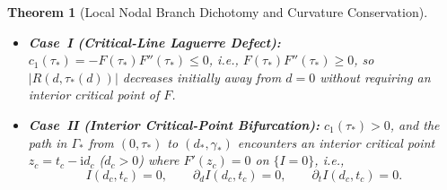 \documentclass[11pt,reqno]{amsart}
\newtheorem{theorem}{Theorem}[section]
\theoremstyle{definition}
\theoremstyle{remark}
\numberwithin{equation}{section}
\newcommand{\ii}{\mathrm{i}}
\begin{document}
\begin{theorem}[Local Nodal Branch Dichotomy and Curvature Conservation]
\begin{enumerate}[label=\upshape(\alph*),leftmargin=2.2em]
\begin{itemize}[leftmargin=1.8em]
\item \textbf{Case~I (Critical-Line Laguerre Defect):} $c_1(\tau_*) = -F(\tau_*)F''(\tau_*) \le 0$, i.e., $F(\tau_*)F''(\tau_*) \ge 0$, so $|R(d,\tau_*(d))|$ decreases initially away from $d=0$ without requiring an interior critical point of $F$.
\item \textbf{Case~II (Interior Critical-Point Bifurcation):} $c_1(\tau_*) > 0$, and the path in $\Gamma_*$ from $(0,\tau_*)$ to $(d_*,\gamma_*)$ encounters an interior critical point $z_c = t_c - \ii d_c$ ($d_c > 0$) where $F'(z_c)=0$ on $\{I=0\}$, i.e.,
\begin{equation}\label{eq:codim-3-system}
I(d_c,t_c) = 0, \qquad \partial_d I(d_c,t_c) = 0, \qquad \partial_t I(d_c,t_c) = 0.
\end{equation}
\end{itemize}
\end{enumerate}
\end{theorem}
\end{document}
